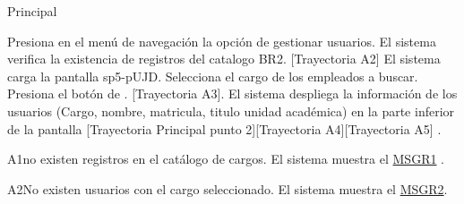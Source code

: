 \begin{UCtrayectoria}{Principal}
    
    \UCpaso[\UCactor] Presiona en el menú de navegación la opción de gestionar usuarios. 
    \UCpaso  El sistema verifica la existencia de registros del catalogo  BR2. [Trayectoria A2] 
    \UCpaso El sistema carga la pantalla sp5-pUJD.
    \UCpaso[\UCactor] Selecciona el cargo de los empleados a buscar. 
    \UCpaso[\UCactor]  Presiona el botón de . [Trayectoria A3].
    \UCpaso El sistema despliega la información  de los usuarios (Cargo, nombre, matricula, titulo unidad académica) en la parte inferior de la pantalla [Trayectoria Principal punto 2][Trayectoria A4][Trayectoria A5] .
\end{UCtrayectoria}

\begin{UCtrayectoriaA}{A1}{no existen registros en el catálogo de cargos.}
	\UCpaso 	El sistema muestra el \hyperref[itm:MSGR1]{MSGR1} .
\end{UCtrayectoriaA}

\begin{UCtrayectoriaA}{A2}{No existen  usuarios con el cargo seleccionado.}
	\UCpaso 	El sistema muestra el \hyperref[MSGR2]{MSGR2}.
\end{UCtrayectoriaA}

